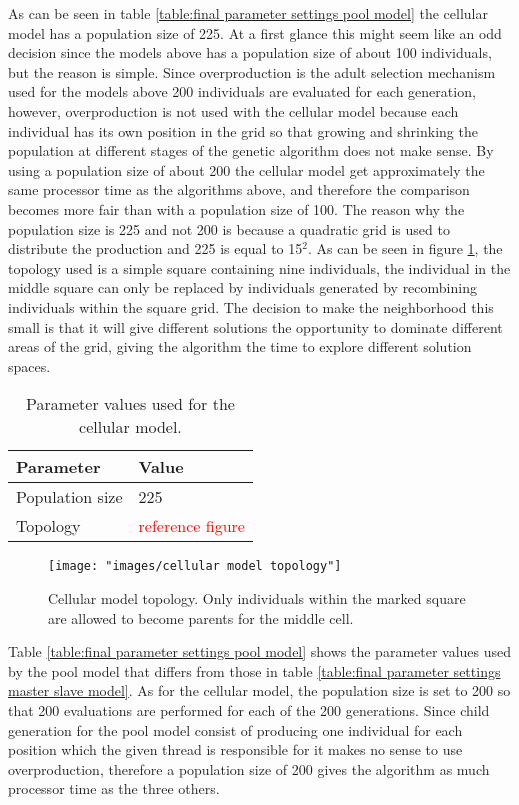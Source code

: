 \documentclass[12pt]{report}
\begin{document}
\noindent As can be seen in table \ref{table:final parameter settings pool model} the cellular model has a population size of 225. At a first glance this might seem like an odd decision since the models above has a population size of about 100 individuals, but the reason is simple. Since overproduction is the adult selection mechanism used for the models above 200 individuals are evaluated for each generation, however, overproduction is not used with the cellular model because each individual has its own position in the grid so that growing and shrinking the population at different stages of the genetic algorithm does not make sense. By using a population size of about 200 the cellular model get approximately the same processor time as the algorithms above, and therefore the comparison becomes more fair than with a population size of 100. The reason why the population size is 225 and not 200 is because a quadratic grid is used to distribute the production and 225 is equal to 15$^{2}$. As can be seen in figure \ref{figure:cellular model topology}, the topology used is a simple square containing nine individuals, the individual in the middle square can only be replaced by individuals generated by recombining individuals within the square grid. The decision to make the neighborhood this small is that it will give different solutions the opportunity to dominate different areas of the grid, giving the algorithm the time to explore different solution spaces.\\


\begin{table}
\centering
\caption{Parameter values used for the cellular model.}
\label{table:final parameter settings cellular model}
\begin{tabular}{l|l}
\textbf{Parameter} & \textbf{Value} \\ 
\hline 
Population size & 225 \\
Topology & \textcolor{red}{reference figure} \\  
\end{tabular}
\end{table}


\begin{figure}
\centering
\texttt{[image: "images/cellular model topology"]}
\caption{Cellular model topology. Only individuals within the marked square are allowed to become parents for the middle cell.}
\label{figure:cellular model topology}
\end{figure}


\noindent Table \ref{table:final parameter settings pool model} shows the parameter values used by the pool model that differs from those in table \ref{table:final parameter settings master slave model}. As for the cellular model, the population size is set to 200 so that 200 evaluations are performed for each of the 200 generations. Since child generation for the pool model consist of producing one individual for each position which the given thread is responsible for it makes no sense to use overproduction, therefore a population size of 200 gives the algorithm as much processor time as the three others.\\
\end{document}
